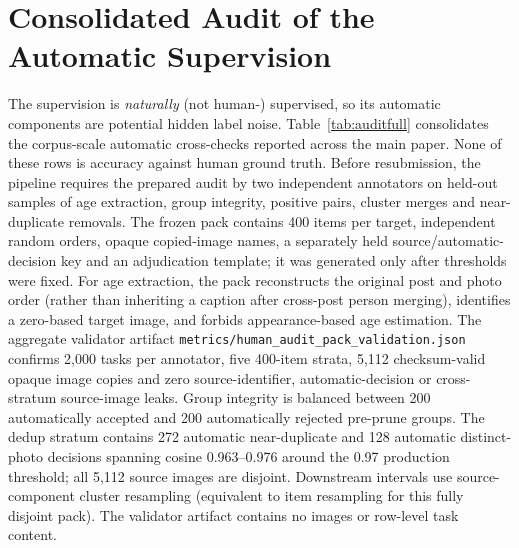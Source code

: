 \documentclass[journal]{IEEEtran}
\begin{document}
\section{Consolidated Audit of the Automatic Supervision}\label{sec:audit}
The supervision is \emph{naturally} (not human-) supervised, so its automatic components are potential
hidden label noise. Table~\ref{tab:auditfull} consolidates the corpus-scale automatic cross-checks
reported across the main paper. None of these rows is accuracy against human ground truth. Before
resubmission, the pipeline requires the prepared audit by two independent annotators on held-out
samples of age extraction, group integrity, positive pairs, cluster merges and near-duplicate removals.
The frozen pack contains 400 items per target, independent random orders, opaque copied-image names,
a separately held source/automatic-decision key and an adjudication template; it was generated only
after thresholds were fixed. For age extraction, the pack
reconstructs the original post and photo order (rather than inheriting a caption after cross-post person
merging), identifies a zero-based target image, and forbids appearance-based age estimation.
The aggregate validator artifact \texttt{metrics/human\_audit\_pack\_validation.json} confirms
2,000 tasks per annotator, five 400-item strata, 5,112 checksum-valid opaque image copies and zero
source-identifier, automatic-decision or cross-stratum source-image leaks. Group integrity is balanced
between 200 automatically accepted and 200 automatically rejected pre-prune groups. The dedup stratum
contains 272 automatic near-duplicate and 128 automatic distinct-photo decisions spanning cosine
0.963--0.976 around the 0.97 production threshold; all 5,112 source images are disjoint. Downstream intervals use source-component cluster
resampling (equivalent to item resampling for this fully disjoint pack). The validator
artifact contains no images or row-level task content.
\end{document}
